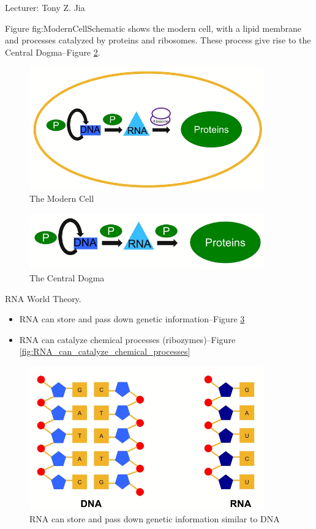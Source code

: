 \documentclass[]{article}
\begin{document}
Lecturer: Tony Z. Jia

Figure {fig:ModernCellSchematic} shows the modern cell, with a lipid membrane and processes catalyzed by proteins and ribosomes. These process give rise to the Central Dogma--Figure \ref{fig:CentralDogmaModernCell}.
\begin{figure}[H]
	\caption{The Modern Cell}\label{fig:ModernCellSchematic}
	\includegraphics[width=0.9\textwidth]{ModernCellSchematic}
\end{figure}

\begin{figure}[H]
	\caption{The Central Dogma}\label{fig:CentralDogmaModernCell}
	\includegraphics[width=0.9\textwidth]{CentralDogmaModernCell}
\end{figure}

RNA World Theory.
\begin{itemize}
	\item  RNA can store and pass down genetic information--Figure \ref{fig:RNA_WorldTheory}
	\item  RNA can catalyze chemical processes (ribozymes)--Figure \ref{fig:RNA_can_catalyze_chemical_processes}\cite{scott2013hammerhead}
\end{itemize}
\begin{figure}[H]
	\caption{RNA can store and pass down genetic information similar to DNA}\label{fig:RNA_WorldTheory}
	\includegraphics[width=0.9\textwidth]{RNA_WorldTheory}
\end{figure}
\end{document}
